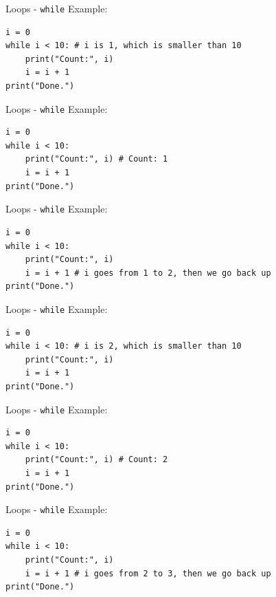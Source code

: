 \documentclass[dvipsnames, svgnames, x11names]{beamer}
\begin{document}
\begin{frame}[fragile]{Loops - \texttt{while}}
Example:
\begin{verbatim}
i = 0
while i < 10: # i is 1, which is smaller than 10
    print("Count:", i)
    i = i + 1
print("Done.")
\end{verbatim}
\end{frame}

\addtocounter{framenumber}{-1}

\begin{frame}[fragile]{Loops - \texttt{while}}
Example:
\begin{verbatim}
i = 0
while i < 10: 
    print("Count:", i) # Count: 1
    i = i + 1
print("Done.")
\end{verbatim}
\end{frame}

\addtocounter{framenumber}{-1}

\begin{frame}[fragile]{Loops - \texttt{while}}
Example:
\begin{verbatim}
i = 0
while i < 10: 
    print("Count:", i)
    i = i + 1 # i goes from 1 to 2, then we go back up
print("Done.")
\end{verbatim}
\end{frame}

\addtocounter{framenumber}{-1}

\begin{frame}[fragile]{Loops - \texttt{while}}
Example:
\begin{verbatim}
i = 0
while i < 10: # i is 2, which is smaller than 10
    print("Count:", i)
    i = i + 1
print("Done.")
\end{verbatim}
\end{frame}

\addtocounter{framenumber}{-1}

\begin{frame}[fragile]{Loops - \texttt{while}}
Example:
\begin{verbatim}
i = 0
while i < 10: 
    print("Count:", i) # Count: 2
    i = i + 1
print("Done.")
\end{verbatim}
\end{frame}

\addtocounter{framenumber}{-1}

\begin{frame}[fragile]{Loops - \texttt{while}}
Example:
\begin{verbatim}
i = 0
while i < 10: 
    print("Count:", i)
    i = i + 1 # i goes from 2 to 3, then we go back up
print("Done.")
\end{verbatim}
\end{frame}
\end{document}
